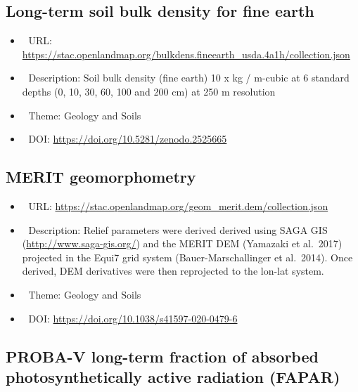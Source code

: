 \documentclass[
  graybox,natbib,nospthms]{svmono}
\providecommand{\tightlist}{%
  \setlength{\itemsep}{0pt}\setlength{\parskip}{0pt}}
\providecommand{\tightlist}{\setlength{\itemsep}{0pt}\setlength{\parskip}{0pt}}
\begin{document}
\hypertarget{long-term-soil-bulk-density-for-fine-earth}{%
\subsection{Long-term soil bulk density for fine earth}\label{long-term-soil-bulk-density-for-fine-earth}}

\begin{itemize}
\tightlist
\item
  🔗 URL: \url{https://stac.openlandmap.org/bulkdens.fineearth_usda.4a1h/collection.json}
\item
  📰 Description: Soil bulk density (fine earth) 10 x kg / m-cubic at 6 standard depths (0, 10, 30, 60, 100 and 200 cm) at 250 m resolution
\item
  📝 Theme: Geology and Soils
\item
  📂 DOI: \url{https://doi.org/10.5281/zenodo.2525665}
\end{itemize}

\hypertarget{merit-geomorphometry}{%
\subsection{MERIT geomorphometry}\label{merit-geomorphometry}}

\begin{itemize}
\tightlist
\item
  🔗 URL: \url{https://stac.openlandmap.org/geom_merit.dem/collection.json}
\item
  📰 Description: Relief parameters were derived derived using SAGA GIS (\url{http://www.saga-gis.org/}) and the MERIT DEM (Yamazaki et al.~2017) projected in the Equi7 grid system (Bauer-Marschallinger et al.~2014). Once derived, DEM derivatives were then reprojected to the lon-lat system.
\item
  📝 Theme: Geology and Soils
\item
  📂 DOI: \url{https://doi.org/10.1038/s41597-020-0479-6}
\end{itemize}

\hypertarget{proba-v-long-term-fraction-of-absorbed-photosynthetically-active-radiation-fapar}{%
\subsection{PROBA-V long-term fraction of absorbed photosynthetically active radiation (FAPAR)}\label{proba-v-long-term-fraction-of-absorbed-photosynthetically-active-radiation-fapar}}
\end{document}
